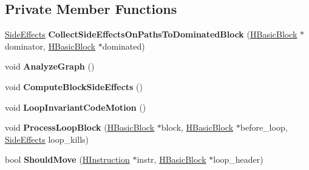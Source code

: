\subsection*{Private Member Functions}
\begin{DoxyCompactItemize}
\item 
\hyperlink{classv8_1_1internal_1_1_side_effects}{Side\+Effects} {\bfseries Collect\+Side\+Effects\+On\+Paths\+To\+Dominated\+Block} (\hyperlink{classv8_1_1internal_1_1_h_basic_block}{H\+Basic\+Block} $\ast$dominator, \hyperlink{classv8_1_1internal_1_1_h_basic_block}{H\+Basic\+Block} $\ast$dominated)\hypertarget{classv8_1_1internal_1_1_h_global_value_numbering_phase_ab531aa263ec8f2fbea23409852471cf2}{}\label{classv8_1_1internal_1_1_h_global_value_numbering_phase_ab531aa263ec8f2fbea23409852471cf2}

\item 
void {\bfseries Analyze\+Graph} ()\hypertarget{classv8_1_1internal_1_1_h_global_value_numbering_phase_a094a12db0c093b3f1afbbfa701edc3ab}{}\label{classv8_1_1internal_1_1_h_global_value_numbering_phase_a094a12db0c093b3f1afbbfa701edc3ab}

\item 
void {\bfseries Compute\+Block\+Side\+Effects} ()\hypertarget{classv8_1_1internal_1_1_h_global_value_numbering_phase_a636ec11338c4ba3f3a084dfa27b3cb6c}{}\label{classv8_1_1internal_1_1_h_global_value_numbering_phase_a636ec11338c4ba3f3a084dfa27b3cb6c}

\item 
void {\bfseries Loop\+Invariant\+Code\+Motion} ()\hypertarget{classv8_1_1internal_1_1_h_global_value_numbering_phase_aad520ff29ba5c740c82b251ea03515bc}{}\label{classv8_1_1internal_1_1_h_global_value_numbering_phase_aad520ff29ba5c740c82b251ea03515bc}

\item 
void {\bfseries Process\+Loop\+Block} (\hyperlink{classv8_1_1internal_1_1_h_basic_block}{H\+Basic\+Block} $\ast$block, \hyperlink{classv8_1_1internal_1_1_h_basic_block}{H\+Basic\+Block} $\ast$before\+\_\+loop, \hyperlink{classv8_1_1internal_1_1_side_effects}{Side\+Effects} loop\+\_\+kills)\hypertarget{classv8_1_1internal_1_1_h_global_value_numbering_phase_aa25995baefd97bbab5b79a8b9e2cca5e}{}\label{classv8_1_1internal_1_1_h_global_value_numbering_phase_aa25995baefd97bbab5b79a8b9e2cca5e}

\item 
bool {\bfseries Should\+Move} (\hyperlink{classv8_1_1internal_1_1_h_instruction}{H\+Instruction} $\ast$instr, \hyperlink{classv8_1_1internal_1_1_h_basic_block}{H\+Basic\+Block} $\ast$loop\+\_\+header)\hypertarget{classv8_1_1internal_1_1_h_global_value_numbering_phase_a8e178ad920829835f6a15a9ed8521496}{}\label{classv8_1_1internal_1_1_h_global_value_numbering_phase_a8e178ad920829835f6a15a9ed8521496}


\end{DoxyCompactItemize}
